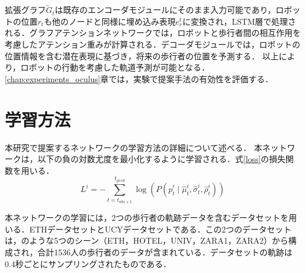 拡張グラフ$\tilde{G}_t$は既存のエンコーダモジュールにそのまま入力可能であり，ロボットの位置$r_t$も他のノードと同様に埋め込み表現$e^t_r$に変換され，LSTM層で処理される．グラフアテンションネットワークでは，ロボットと歩行者間の相互作用を考慮したアテンション重みが計算される．デコーダモジュールでは，ロボットの位置情報を含む潜在表現に基づき，将来の歩行者の位置を予測する．
以上により，ロボットの行動を考慮した軌道予測が可能となる．\ref{chap:experiments_oculus}章では，実験で提案手法の有効性を評価する．

\vspace{-5pt}
\section{学習方法}\label{sec:learning-method}
本研究で提案するネットワークの学習方法の詳細について述べる．
本ネットワークは，以下の負の対数尤度を最小化するように学習される．式\eqref{loss}の損失関数を用いる．
\begin{equation}
  L^i = -\sum_{t=t_{obs+1}}^{t_{pred}} \log \left( P(\hat{p}^i_t \mid \hat{\mu}^i_t, \hat{\sigma}^i_t, \hat{\rho}^i_t) \right) \label{loss}
\end{equation}

本ネットワークの学習には，2つの歩行者の軌跡データを含むデータセットを用いる．ETHデータセット\cite{pellegrini2009you-eth}とUCYデータセット\cite{lerner2007crowds-ucy}である．この2つのデータセットは，のような5つのシーン（ETH，HOTEL，UNIV，ZARA1，ZARA2）から構成され，合計1536人の歩行者のデータが含まれている．データセットの軌跡は0.4秒ごとにサンプリングされたものである．

